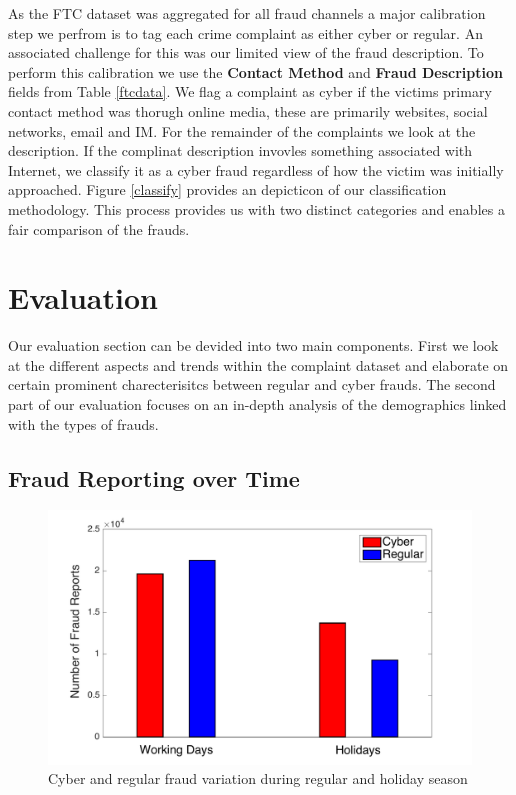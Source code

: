 \documentclass[conference]{IEEEtran}
\begin{document}
As the FTC dataset was aggregated for all fraud channels a major calibration step we perfrom is to tag each crime complaint as either cyber or regular. An associated challenge for this was our limited view of the fraud description. To perform this calibration we use the \textbf{Contact Method} and \textbf{Fraud Description} fields from Table \ref{ftcdata}. We flag a complaint as cyber if the victims primary contact method was thorugh online media, these are primarily websites, social networks, email and IM. For the remainder of the complaints we look at the description. If the complinat description invovles something associated with Internet, we classify it as a cyber fraud regardless of how the victim was initially approached. Figure \ref{classify} provides an depicticon of our classification methodology. This process  provides us with two distinct categories  and enables a fair comparison of the frauds. 


\section{Evaluation}

Our evaluation section can be devided into two main components. First we look at the different aspects and trends within the complaint dataset and elaborate on certain prominent charecterisitcs between regular and cyber frauds. The second part of our evaluation focuses on an in-depth analysis of the demographics linked with the types of frauds.

\subsection{Fraud Reporting over Time}

\begin{figure}
\centering
  \includegraphics[scale=0.35]{graphics/reg_vs_holiday.pdf}
  \caption{Cyber and regular fraud variation during regular and holiday season}
  \label{temporal}
\end{figure}
\end{document}
